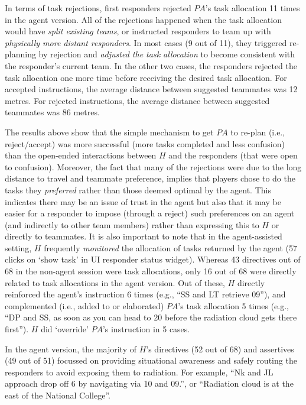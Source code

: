 In terms of task rejections, first responders rejected $PA$'s task allocation 11 times in the agent version. All of the rejections happened when the task allocation would have \emph{split existing teams}, or instructed responders to team up with \emph{physically more distant responders}. In most cases (9 out of 11), they triggered re-planning by rejection and \emph{adjusted the task allocation} to become consistent with the responder's current team. In the other two cases, the responders rejected  the task allocation one more time before receiving the desired task allocation. For accepted instructions, the average distance between suggested teammates was 12 metres. For rejected instructions, the average distance between suggested teammates was 86 metres.

The results above show that  the simple mechanism to get $PA$ to re-plan (i.e., reject/accept) was more successful (more tasks completed and less confusion) than the open-ended interactions between $H$ and the responders (that were open to confusion).  Moreover, the fact that many of the rejections were due to the long distance to travel and teammate preference, implies that players chose to do the tasks they \emph{preferred}  rather than those deemed optimal by the agent. This indicates there may be an issue of trust in the agent but also that it may be easier for a responder  to impose (through a reject) such preferences on an agent (and indirectly to other team members) rather than expressing this to $H$ or directly to teammates. 
It is also important to note that in the agent-assisted setting, $H$ frequently \emph{monitored} the allocation of tasks  returned by the agent (57 clicks on `show task' in UI responder status widget). Whereas 43 directives out of 68 in the non-agent session were task allocations, only 16 out of 68 were directly related to task allocations in the agent version. Out of these, $H$ directly reinforced the agent's instruction 6 times (e.g., ``SS and LT retrieve 09''), and complemented (i.e., added to or elaborated) $PA$'s task allocation 5 times (e.g., ``DP and SS, as soon as you can head to 20 before the radiation cloud gets there first''). $H$  did `override' $PA$'s instruction in 5 cases.  

In the agent version, the majority of $H$'s directives (52 out of 68) and assertives (49 out of 51) focussed on providing situational awareness and safely routing the responders to avoid exposing them to radiation. For example, ``Nk and JL approach drop off 6 by navigating via 10 and 09.'', or ``Radiation cloud is at the east of the National College''. 

